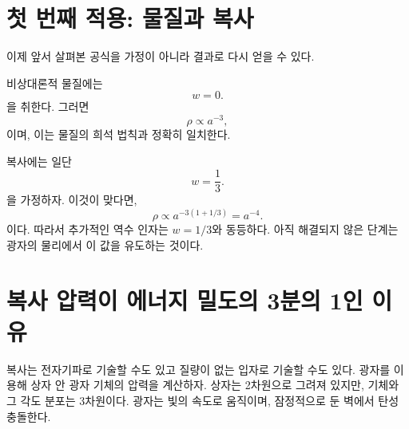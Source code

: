 \section{첫 번째 적용: 물질과 복사}

이제 앞서 살펴본 공식을 가정이 아니라 결과로 다시 얻을 수 있다.

비상대론적 물질에는
\begin{equation}
w=0.
\end{equation}
을 취한다. 그러면
\begin{equation}
\rho\propto a^{-3},
\end{equation}
이며, 이는 물질의 희석 법칙과 정확히 일치한다.

복사에는 일단
\begin{equation}
w=\frac13.
\end{equation}
을 가정하자. 이것이 맞다면,
\begin{equation}
\rho\propto a^{-3(1+1/3)}=a^{-4}.
\end{equation}
이다. 따라서 추가적인 역수 인자는 \(w=1/3\)와 동등하다. 아직 해결되지 않은 단계는 광자의 물리에서 이 값을 유도하는 것이다.

\section{복사 압력이 에너지 밀도의 3분의 1인 이유}

복사는 전자기파로 기술할 수도 있고 질량이 없는 입자로 기술할 수도 있다. 광자를 이용해 상자 안 광자 기체의 압력을 계산하자. 상자는 2차원으로 그려져 있지만, 기체와 그 각도 분포는 3차원이다. 광자는 빛의 속도로 움직이며, 잠정적으로 둔 벽에서 탄성 충돌한다.

